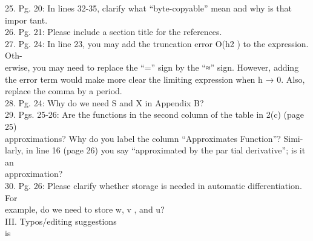 25. Pg. 20: In lines 32-35, clarify what ``byte-copyable'' mean and why
is that impor tant. \\26. Pg. 21: Please include a section title for the
references. \\27. Pg. 24: In line 23, you may add the truncation error
O(h2 ) to the expression. Oth- \\erwise, you may need to replace the
``='' sign by the ``≈'' sign. However, adding \\the error term would
make more clear the limiting expression when h → 0. Also, \\replace the
comma by a period. \\28. Pg. 24: Why do we need S and X in Appendix B?
\\29. Pgs. 25-26: Are the functions in the second column of the table in
2(c) (page 25) \\approximations? Why do you label the column
``Approximates Function''? Simi- \\larly, in line 16 (page 26) you say
``approximated by the par tial derivative''; is it an \\approximation?
\\30. Pg. 26: Please clarify whether storage is needed in automatic
differentiation. For \\example, do we need to store w, v , and u? \\III.
Typos/editing suggestions \\

is \\

